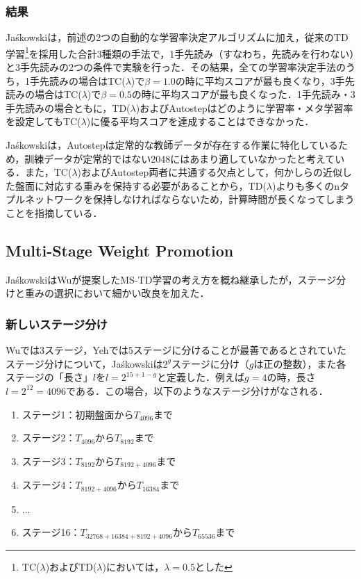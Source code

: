 \documentclass{suribt}
\begin{document}
\subsubsection{結果}
Ja\'{s}kowskiは，前述の2つの自動的な学習率決定アルゴリズムに加え，従来のTD学習\footnote{TC(${\lambda}$)およびTD(${\lambda}$)においては，${\lambda}=0.5$とした}を採用した合計3種類の手法で，1手先読み（すなわち，先読みを行わない）と3手先読みの2つの条件で実験を行った．その結果，全ての学習率決定手法のうち，1手先読みの場合はTC(${\lambda}$)で${\beta}=1.0$の時に平均スコアが最も良くなり，3手先読みの場合はTC(${\lambda}$)で${\beta}=0.5$の時に平均スコアが最も良くなった．1手先読み・3手先読みの場合ともに，TD(${\lambda}$)およびAutostepはどのように学習率・メタ学習率を設定してもTC(${\lambda}$)に優る平均スコアを達成することはできなかった．

Ja\'{s}kowskiは，Autostepは定常的な教師データが存在する作業に特化しているため，訓練データが定常的ではない2048にはあまり適していなかったと考えている．また，TC(${\lambda}$)およびAutostep両者に共通する欠点として，何かしらの近似した盤面に対応する重みを保持する必要があることから，TD(${\lambda}$)よりも多くのnタプルネットワークを保持しなければならないため，計算時間が長くなってしまうことを指摘している．

\subsection{Multi-Stage Weight Promotion}
Ja\'{s}kowskiはWuが提案したMS-TD学習の考え方を概ね継承したが，ステージ分けと重みの選択において細かい改良を加えた．

\subsubsection{新しいステージ分け}
Wuでは3ステージ，Yehでは5ステージに分けることが最善であるとされていたステージ分けについて，Ja\'{s}kowskiは$2^g$ステージに分け（$g$は正の整数），また各ステージの「長さ」$l$を$l = 2^{15+1-g}$と定義した．例えば$g=4$の時，長さ$l=2^{12}=4096$である．この場合，以下のようなステージ分けがなされる．

\begin{enumerate}
\item ステージ1：初期盤面から$T_{4096}$まで
\item ステージ2：$T_{4096}$から$T_{8192}$まで
\item ステージ3：$T_{8192}$から$T_{8192+4096}$まで
\item ステージ4：$T_{8192+4096}$から$T_{16384}$まで
\item ...
\item ステージ16：$T_{32768+16384+8192+4096}$から$T_{65536}$まで
\end{enumerate}
\end{document}
